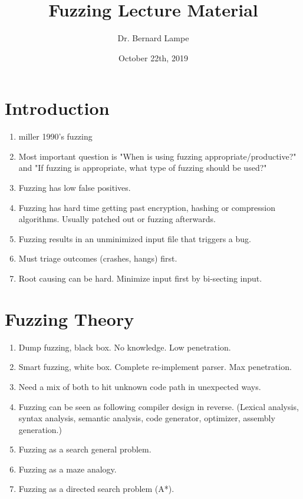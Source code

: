 \documentclass[12pt]{Training}
\title{Fuzzing Lecture Material}
\author{Dr. Bernard Lampe}
\date{October 22th, 2019}
\begin{document}
\maketitle


\section*{Introduction}
\begin{enumerate}
    \item miller 1990's fuzzing
    \item Most important question is "When is using fuzzing appropriate/productive?" and "If fuzzing is appropriate, what type of fuzzing should be used?"
	\item Fuzzing has low false positives.
    \item Fuzzing has hard time getting past encryption, hashing or compression algorithms. Usually patched out or fuzzing afterwards.

	\item Fuzzing results in an unminimized input file that triggers a bug.
	\item Must triage outcomes (crashes, hangs) first.
	\item Root causing can be hard. Minimize input first by bi-secting input.
\end{enumerate}

\section*{Fuzzing Theory}
\begin{enumerate}
	\item Dump fuzzing, black box. No knowledge. Low penetration.
	\item Smart fuzzing, white box. Complete re-implement parser. Max penetration.
    \item Need a mix of both to hit unknown code path in unexpected ways.

    \item Fuzzing can be seen as following compiler design in reverse. (Lexical analysis, syntax analysis, semantic analysis, code generator, optimizer, assembly generation.)
	\item Fuzzing as a search general problem.
	\item Fuzzing as a maze analogy.
	\item Fuzzing as a directed search problem (A*).
\end{enumerate}
\end{document}

